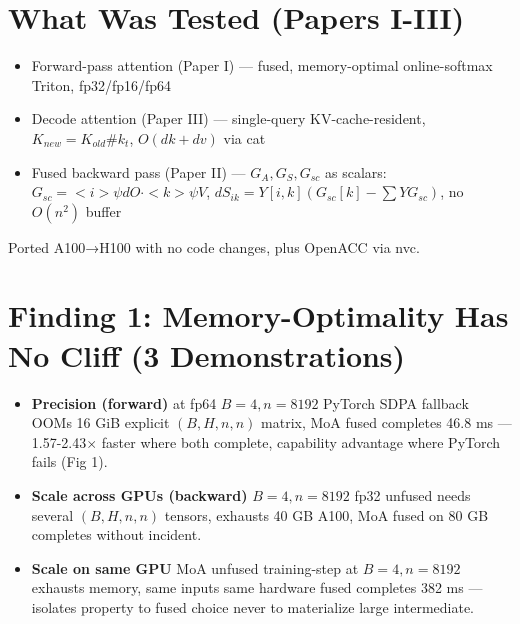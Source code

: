 \documentclass[11pt]{article}
\begin{document}
\section{What Was Tested (Papers I-III)}
\begin{itemize}
\item Forward-pass attention (Paper I) — fused, memory-optimal online-softmax Triton, fp32/fp16/fp64
\item Decode attention (Paper III) — single-query KV-cache-resident, $K_{new}=K_{old}\# k_t$, $O(dk+dv)$ via cat
\item Fused backward pass (Paper II) — $G_A,G_S,G_{sc}$ as scalars: $G_{sc}=<i>\psi dO\cdot<k>\psi V$, $dS_{ik}=Y[i,k](G_{sc}[k]-\sum Y G_{sc})$, no $O(n^2)$ buffer
\end{itemize}
Ported A100→H100 with no code changes, plus OpenACC via nvc.

\section{Finding 1: Memory-Optimality Has No Cliff (3 Demonstrations)}
\begin{itemize}
\item \textbf{Precision (forward)} at fp64 $B=4,n=8192$ PyTorch SDPA fallback OOMs 16 GiB explicit $(B,H,n,n)$ matrix, MoA fused completes 46.8 ms — 1.57-2.43$\times$ faster where both complete, capability advantage where PyTorch fails (Fig 1).
\item \textbf{Scale across GPUs (backward)} $B=4,n=8192$ fp32 unfused needs several $(B,H,n,n)$ tensors, exhausts 40 GB A100, MoA fused on 80 GB completes without incident.
\item \textbf{Scale on same GPU} MoA unfused training-step at $B=4,n=8192$ exhausts memory, same inputs same hardware fused completes 382 ms — isolates property to fused choice never to materialize large intermediate.
\end{itemize}
\end{document}
